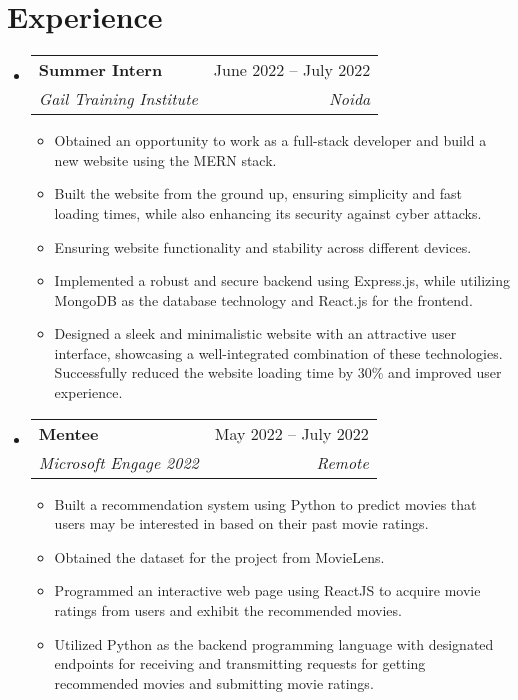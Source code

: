 \documentclass[a4paper,11pt]{article}
\makeatletter
\newcommand{\resumeItem}[1]{
    \item\small{
        {#1 \vspace{-2pt}}
    }
}
\newcommand{\resumeSubheading}[4]{
    \vspace{-2pt}\item
    \begin{tabular*}{0.97\textwidth}[t]{l@{\extracolsep{\fill}}r}
        \textbf{#1} & #2 \\
        \textit{\small#3} & \textit{\small #4} \\
    \end{tabular*}\vspace{-7pt}
}
\newcommand{\resumeSubSubheading}[2]{
    \item
    \begin{tabular*}{0.97\textwidth}{l@{\extracolsep{\fill}}r}
        \textit{\small#1} & \textit{\small #2} \\
    \end{tabular*}\vspace{-7pt}
}
\newcommand{\resumeSubHeadingListStart}{\begin{itemize}[leftmargin=0.15in, label={}]}
\newcommand{\resumeSubHeadingListEnd}{\end{itemize}}
\newcommand{\resumeItemListStart}{\begin{itemize}}
\newcommand{\resumeItemListEnd}{\end{itemize}\vspace{-5pt}}
\makeatother
\begin{document}
\section{Experience}
\resumeSubHeadingListStart

\resumeSubheading
{Summer Intern}{June 2022 -- July 2022}
{Gail Training Institute}{Noida}
\resumeItemListStart
\resumeItem {Obtained an opportunity to work as a full-stack developer and build a new website using the MERN stack.}
\resumeItem {Built the website from the ground up, ensuring simplicity and fast loading times, while also enhancing its security against cyber attacks.}
\resumeItem {Ensuring website functionality and stability across different devices.}
\resumeItem {Implemented a robust and secure backend using Express.js, while utilizing MongoDB as the database technology and React.js for the frontend.}
\resumeItem{Designed a sleek and minimalistic website with an attractive user interface, showcasing a well-integrated combination of these technologies. Successfully reduced the website loading time by 30\% and improved user experience.}
\resumeItemListEnd


\resumeSubheading
{Mentee}{May 2022 -- July 2022}
{Microsoft Engage 2022}{Remote}
\resumeItemListStart
\resumeItem {Built a recommendation system using Python to predict movies that users may be interested in based on their past movie ratings.}
\resumeItem {Obtained the dataset for the project from MovieLens.}
\resumeItem{Programmed an interactive web page using ReactJS to acquire movie ratings from users and exhibit the recommended movies.}
\resumeItem {Utilized Python as the backend programming language with designated endpoints for receiving and transmitting requests for getting recommended movies and submitting movie ratings.}
\resumeItemListEnd

\resumeSubHeadingListEnd


\end{document}
